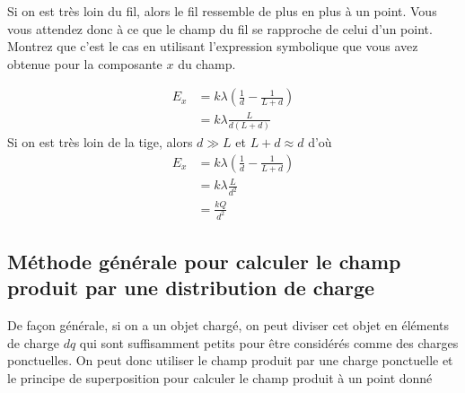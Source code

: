 Si on est très loin du fil, alors le fil ressemble de plus en plus à un point.
Vous vous attendez donc à ce que le champ du fil se rapproche de celui d'un
point. Montrez que c'est le cas en utilisant l'expression symbolique que vous
avez obtenue pour la composante $x$ du champ.

\begin{reponsebox}
  \begin{align*}
    E_{x} &= k \lambda \left( \frac{1}{d} - \frac{1}{L + d} \right)  \\
          &= k \lambda  \frac{L}{d(L + d)}
  \end{align*}
  Si on est très loin de la tige, alors $d \gg L$ et $L + d \approx d$ d'où
  \begin{align*}
    E_{x} &= k \lambda \left( \frac{1}{d} - \frac{1}{L + d} \right)  \\
          &= k \lambda  \frac{L}{d^2}  \\
          &= \frac{kQ}{d^2}
  \end{align*}
\end{reponsebox}




\subsection{Méthode générale pour calculer le champ produit par une
  distribution de charge}


De façon générale, si on a un objet chargé, on peut diviser cet objet en
éléments de charge $dq$ qui sont suffisamment petits pour être considérés comme
des charges ponctuelles. On peut donc utiliser le champ produit par une charge
ponctuelle et le principe de superposition pour calculer le champ produit à un
point donné

